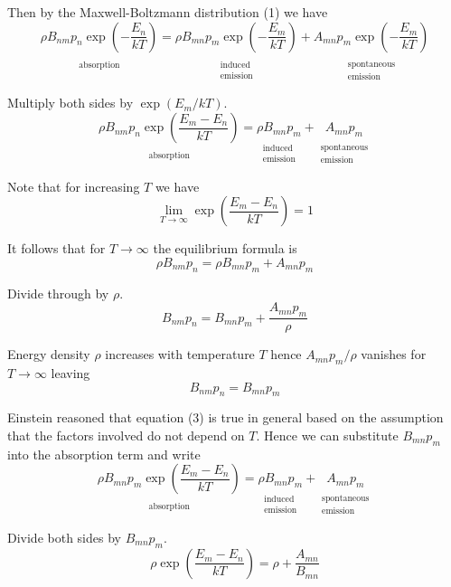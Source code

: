 \documentclass[12pt]{article}
\newcommand\BNM{B_{nm}} %
\newcommand\BMN{B_{mn}} %
\newcommand\AMN{A_{mn}} %
\newcommand\RHO{\rho}
\newcommand\ABSORPTION{\substack{\\[1ex] \text{absorption}}}
\newcommand\INDUCED{\substack{\\[1ex] \text{induced}\\ \text{emission}}}
\newcommand\SPONTANEOUS{\substack{\\[1ex] \text{spontaneous}\\ \text{emission}}}
\begin{document}
Then by the Maxwell-Boltzmann distribution (1) we have
\begin{equation*}
\underset{\ABSORPTION}{\RHO\BNM p_n\exp\left(-\frac{E_n}{kT}\right)}
=\underset{\INDUCED}{\RHO\BMN p_m\exp\left(-\frac{E_m}{kT}\right)}
+\underset{\SPONTANEOUS}{\AMN p_m\exp\left(-\frac{E_m}{kT}\right)}
\tag{2}
\end{equation*}

Multiply both sides by $\exp(E_m/kT)$.
\begin{equation*}
\underset{\ABSORPTION}{\RHO\BNM p_n\exp\left(\frac{E_m-E_n}{kT}\right)}
=\underset{\INDUCED}{\RHO\BMN p_m}
+\underset{\SPONTANEOUS}{\AMN p_m}
\end{equation*}

Note that for increasing $T$ we have
\begin{equation*}
\lim_{T\rightarrow\infty}\exp\left(\frac{E_m-E_n}{kT}\right)=1
\end{equation*}

It follows that for $T\rightarrow\infty$ the equilibrium formula is
\begin{equation*}
\RHO\BNM p_n
=\RHO\BMN p_m
+\AMN p_m
\end{equation*}

Divide through by $\RHO$.
\begin{equation*}
\BNM p_n=\BMN p_m+\frac{\AMN p_m}{\RHO}
\end{equation*}

Energy density $\RHO$ increases with temperature $T$
hence $\AMN p_m/\RHO$ vanishes for $T\rightarrow\infty$ leaving
\begin{equation*}
\BNM p_n=\BMN p_m
\tag{3}
\end{equation*}

Einstein reasoned that equation (3) is true in general based on the assumption that
the factors involved do not depend on $T$.
Hence we can substitute $B_{mn}p_m$ into the absorption term and write
\begin{equation*}
\underset{\ABSORPTION}{\RHO\BMN p_m\exp\left(\frac{E_m-E_n}{kT}\right)}
=\underset{\INDUCED}{\RHO\BMN p_m}
+\underset{\SPONTANEOUS}{\AMN p_m}
\end{equation*}

Divide both sides by $\BMN p_m$.
\begin{equation*}
\RHO\exp\left(\frac{E_m-E_n}{kT}\right)
=\RHO+\frac{\AMN}{\BMN}
\end{equation*}
\end{document}

